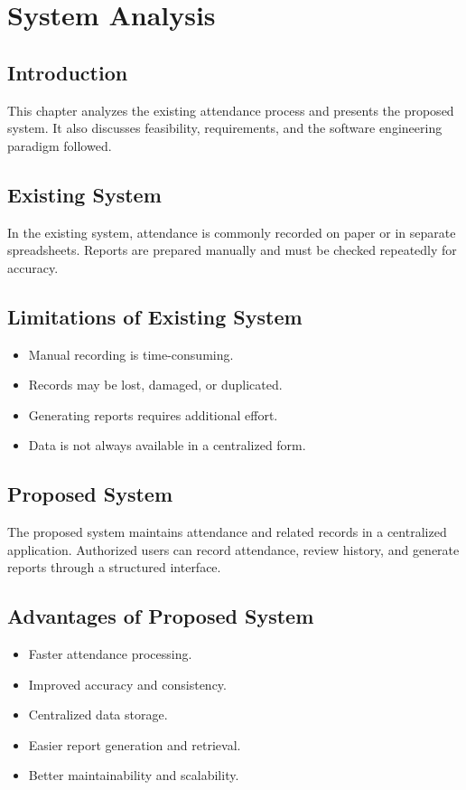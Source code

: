 \documentclass[12pt,a4paper]{report}
\begin{document}
\chapter{System Analysis}

\section{Introduction}
This chapter analyzes the existing attendance process and presents the proposed system. It also discusses feasibility, requirements, and the software engineering paradigm followed.

\section{Existing System}
In the existing system, attendance is commonly recorded on paper or in separate spreadsheets. Reports are prepared manually and must be checked repeatedly for accuracy.

\section{Limitations of Existing System}
\begin{itemize}
  \item Manual recording is time-consuming.
  \item Records may be lost, damaged, or duplicated.
  \item Generating reports requires additional effort.
  \item Data is not always available in a centralized form.
\end{itemize}

\section{Proposed System}
The proposed system maintains attendance and related records in a centralized application. Authorized users can record attendance, review history, and generate reports through a structured interface.

\section{Advantages of Proposed System}
\begin{itemize}
  \item Faster attendance processing.
  \item Improved accuracy and consistency.
  \item Centralized data storage.
  \item Easier report generation and retrieval.
  \item Better maintainability and scalability.
\end{itemize}
\end{document}
